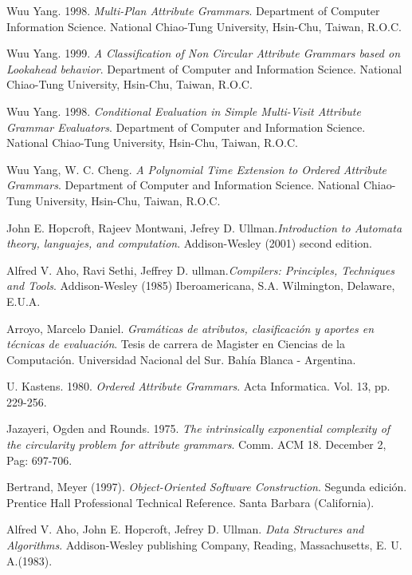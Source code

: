 
\begin{thebibliography}{10}

 Wuu Yang. 1998. \textit{Multi-Plan Attribute Grammars}. Department of Computer Information Science. National Chiao-Tung University, Hsin-Chu, Taiwan, R.O.C.

 Wuu Yang. 1999. \textit{A Classification of Non Circular Attribute Grammars based on Lookahead behavior}. Department of Computer and Information Science. National Chiao-Tung University, Hsin-Chu, Taiwan, R.O.C.

 Wuu Yang. 1998. \textit{Conditional Evaluation in Simple Multi-Visit Attribute Grammar Evaluators}. Department of Computer and Information Science. National
Chiao-Tung University, Hsin-Chu, Taiwan, R.O.C.

 Wuu Yang, W. C. Cheng. \emph{A Polynomial Time Extension to
Ordered Attribute Grammars}. Department of Computer and Information Science. 
National Chiao-Tung University, Hsin-Chu, Taiwan, R.O.C.


 John E. Hopcroft, Rajeev Montwani, Jefrey D. Ullman.\textit{Introduction to Automata theory, languajes, and computation}. Addison-Wesley (2001) second edition.

 Alfred V. Aho, Ravi Sethi, Jeffrey D. ullman.\textit{Compilers: Principles, Techniques and Tools}. Addison-Wesley (1985)  Iberoamericana, S.A. Wilmington, Delaware, E.U.A.

 Arroyo, Marcelo Daniel. \textit{Gramáticas de atributos, clasificación y aportes en técnicas de evaluación}. Tesis de carrera de Magister en Ciencias de la Computación. Universidad Nacional del Sur. Bahía Blanca - Argentina.

 U. Kastens. 1980. \textit{Ordered Attribute Grammars}. Acta Informatica. Vol. 13, pp. 229-256.

 Jazayeri, Ogden and Rounds. 1975. \emph{The intrinsically 
exponential complexity of the circularity problem for attribute grammars}. 
Comm. ACM 18. December 2, Pag: 697-706.

 Bertrand, Meyer (1997). \textit{Object-Oriented Software Construction}. Segunda edición. Prentice Hall Professional Technical Reference. Santa Barbara (California).

 Alfred V. Aho, John E. Hopcroft, Jefrey D. Ullman. \textit{Data Structures and Algorithms}. Addison-Wesley publishing Company, Reading, Massachusetts, E. U. A.(1983).


\end{thebibliography}
